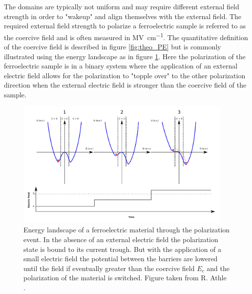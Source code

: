 \documentclass[11pt,twoside]{eitExjobb}
\begin{document}
The domains are typically not uniform and may require different external field
strength in order to "wakeup" and align themselves with the external field. The
required external field strength to polarize a ferroelectric sample is referred
to as the coercive field and is often measured in
\si{\mega\volt\per\centi\meter}. The quantitative definition of the coercive
field is described in figure \ref{fig:theo_PE} but is commonly illustrated
using the energy landscape as in figure \ref{fig:theo_Ec}. Here the
polarization of the ferroelectric sample is in a binary system where the
application of an external electric field allows for the polarization to
"topple over" to the other polarization direction when the external electric
field is stronger than the coercive field of the sample.

\begin{figure}[htbp]
    \centering
    \includegraphics[width=0.95\textwidth]{fig/img/coercivefield.png}
    \caption{Energy landscape of a ferroelectric material through the
    polarization event. In the absence of an external electric field the
    polarization state is bound to its current trough. But with the application
    of a small electric field the potential between the barriers are lowered until
    the field if eventually greater than the coercive field $E_c$ and the
    polarization of the material is switched. Figure taken from R. Athle
    \cite{athle2019development}.}
    \label{fig:theo_Ec}
\end{figure}
\end{document}
